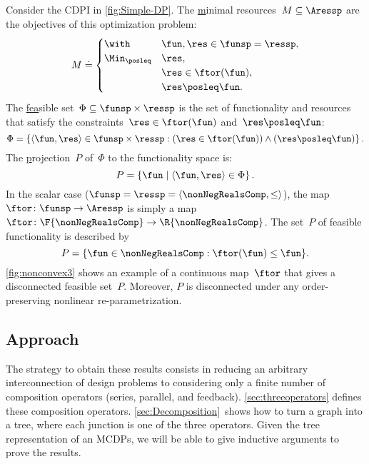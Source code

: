 \begin{example}
    \label{exa:one}
    Consider the CDPI in \cref{fig:Simple-DP}. The \uline{m}inimal resources~$M\subseteq\Aressp$ are the objectives of this optimization problem:
    \[
        M\doteq\begin{cases}
                   \with & \fun,\res\in\funsp=\ressp,\\
                   \Min_{\posleq} & \res,\\
                   & \res\in\ftor(\fun),\\
                   & \res\posleq\fun.
        \end{cases}
    \]
    The \uline{fea}sible set~$\Phi\subseteq\funsp\times\ressp$ is
    the set of functionality and resources that satisfy the constraints~$\res\in\ftor(\fun)$
    and~$\res\posleq\fun$:
    \begin{equation}
        \Phi=\left\{ \langle\fun,\res\rangle\in\funsp\times\ressp:(\res\in\ftor(\fun))\wedge(\res\posleq\fun)\right\} .\label{eq:feasible}
    \end{equation}
    The \uline{p}rojection~$P$ of~$\Phi$ to the functionality space
    is:
    \[
        P=\left\{ \fun\mid\left\langle \fun,\res\right\rangle \in\Phi\right\}.
    \]
    In the scalar case ($\funsp=\ressp=\langle\nonNegRealsComp,\leq\rangle$),
    the map~$\ftor\colon\funsp\rightarrow\Aressp$ is simply a map~$\ftor\colon\F{\nonNegRealsComp}\rightarrow\R{\nonNegRealsComp}$.
    The set~$P$ of feasible functionality is described by
    \begin{equation}
        P=\{\fun\in\nonNegRealsComp:\ftor(\fun)\leq\fun\}.\label{eq:Pfeasible}
    \end{equation}
    \cref{fig:nonconvex3} shows an example of a continuous map~$\ftor$
    that gives a disconnected feasible set~$P$. Moreover, $P$ is disconnected
    under any order-preserving nonlinear re-parametrization.

\end{example}

\subsection{Approach}

The strategy to obtain these results consists in reducing an arbitrary
interconnection of design problems to considering only a finite
number of composition operators (series, parallel, and feedback).
\cref{sec:threeoperators} defines these composition operators. \cref{sec:Decomposition}~shows
how to turn a graph into a tree, where each junction is one of the
three operators. Given the tree representation of an MCDPs, we will
be able to give inductive arguments to prove the results.


